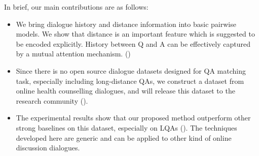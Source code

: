In brief, our main contributions are as follows:
\begin{itemize}
    \item We bring dialogue history and distance information into basic pairwise models. We show that distance is an important feature which is suggested to be encoded explicitly. History between Q and A can be effectively captured by a mutual attention mechanism. () %
    \item Since there is no open source dialogue datasets designed for
QA matching task, especially including long-distance QAs, 
we construct a dataset from online health counselling dialogues,
and will release this dataset to the research community (). 
    \item The experimental results show that our proposed method outperform 
other strong baselines on this dataset, especially on LQAs 
(). The techniques developed here are generic and can
be applied to other kind of online discussion dialogues.
\end{itemize}


